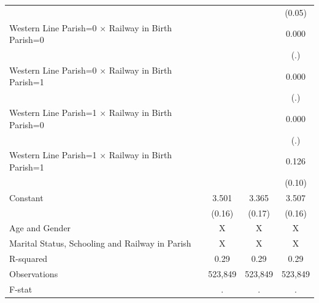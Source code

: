 {\begin{tabular}{l*{3}{c}}
                    &                     &                     &      (0.05)         \\
Western Line Parish=0 $\times$ Railway in Birth Parish=0&                     &                     &       0.000         \\
                    &                     &                     &         (.)         \\
Western Line Parish=0 $\times$ Railway in Birth Parish=1&                     &                     &       0.000         \\
                    &                     &                     &         (.)         \\
Western Line Parish=1 $\times$ Railway in Birth Parish=0&                     &                     &       0.000         \\
                    &                     &                     &         (.)         \\
Western Line Parish=1 $\times$ Railway in Birth Parish=1&                     &                     &       0.126         \\
                    &                     &                     &      (0.10)         \\
Constant            &       3.501\sym{***}&       3.365\sym{***}&       3.507\sym{***}\\
                    &      (0.16)         &      (0.17)         &      (0.16)         \\
\hline
Age and Gender      &           X         &           X         &           X         \\
Marital Status, Schooling and Railway in Parish&           X         &           X         &           X         \\
R-squared           &        0.29         &        0.29         &        0.29         \\
Observations        &     523,849         &     523,849         &     523,849         \\
F-stat              &           .         &           .         &           .         \\
\hline\hline
\end{tabular}
}
